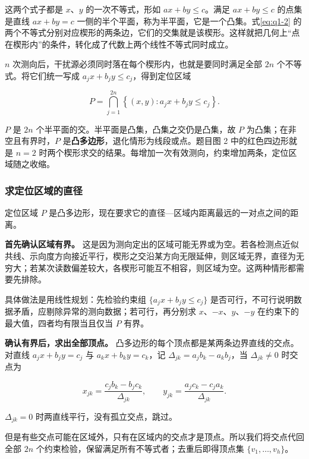 这两个式子都是 $x$、$y$ 的一次不等式，形如 $ax+by\le c$。满足 $ax+by\le c$ 的点集是直线 $ax+by=c$ 一侧的半个平面，称为半平面，它是一个凸集。式\eqref{eq:q1-2} 的两个不等式分别对应楔形的两条边，它们的交集就是该楔形。这样就把几何上“点在楔形内”的条件，转化成了代数上两个线性不等式同时成立。

$n$ 次测向后，干扰源必须同时落在每个楔形内，也就是要同时满足全部 $2n$ 个不等式。将它们统一写成 $a_jx+b_jy\le c_j$，得到定位区域

\begin{equation}\label{eq:q1-3}
P=\bigcap_{j=1}^{2n}\left\{(x,y):a_jx+b_jy\le c_j\right\}.
\end{equation}

$P$ 是 $2n$ 个半平面的交。半平面是凸集，凸集之交仍是凸集，故 $P$ 为凸集；在非空且有界时，$P$ 是\textbf{凸多边形}，退化情形为线段或点。题目图 2 中的红色四边形就是 $n=2$ 时两个楔形求交的结果。每增加一次有效测向，约束增加两条，定位区域随之收缩。

\subsubsection{求定位区域的直径}\label{sec:q1-2}

定位区域 $P$ 是凸多边形，现在要求它的直径---区域内距离最远的一对点之间的距离。

\textbf{首先确认区域有界。} 这是因为测向定出的区域可能无界或为空。若各检测点近似共线、示向度方向接近平行，楔形之交沿某方向无限延伸，则区域无界，直径为无穷大；若某次读数偏差较大，各楔形可能互不相容，则区域为空。这两种情形都需要先排除。

具体做法是用线性规划：先检验约束组 $\{a_jx+b_jy\le c_j\}$ 是否可行，不可行说明数据矛盾，应剔除异常的测向数据；若可行，再分别求 $x$、$-x$、$y$、$-y$ 在约束下的最大值，四者均有限当且仅当 $P$ 有界。

\textbf{确认有界后，求出全部顶点。} 凸多边形的每个顶点都是某两条边界直线的交点。对直线 $a_jx+b_jy=c_j$ 与 $a_kx+b_ky=c_k$，记 $\Delta_{jk}=a_jb_k-a_kb_j$，当 $\Delta_{jk}\ne0$ 时交点为

\begin{equation}\label{eq:q1-4}
x_{jk}=\frac{c_jb_k-b_jc_k}{\Delta_{jk}},\qquad
y_{jk}=\frac{a_jc_k-c_ja_k}{\Delta_{jk}}.
\end{equation}

$\Delta_{jk}=0$ 时两直线平行，没有孤立交点，跳过。

但是有些交点可能在区域外，只有在区域内的交点才是顶点。所以我们将交点代回全部 $2n$ 个约束检验，保留满足所有不等式者；去重后即得顶点集 $\{v_1,\dots,v_h\}$。

